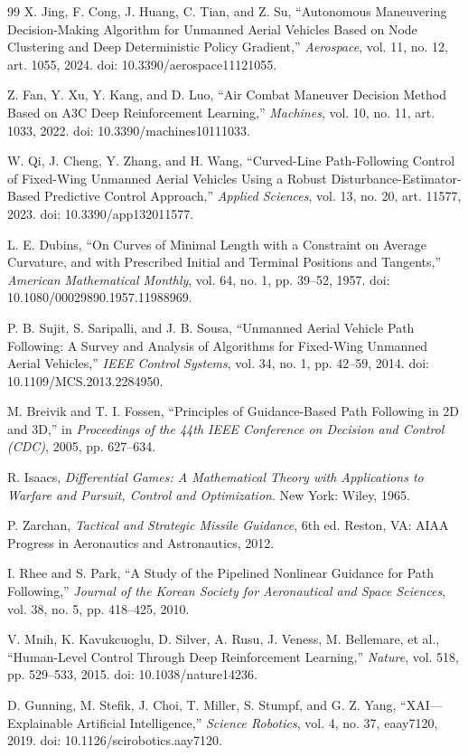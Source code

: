 \documentclass[drones,article,submit,pdftex,moreauthors]{Definitions/mdpi}
\begin{document}
\begin{thebibliography}{99}
X. Jing, F. Cong, J. Huang, C. Tian, and Z. Su,
``Autonomous Maneuvering Decision-Making Algorithm for Unmanned Aerial Vehicles Based on Node Clustering and Deep Deterministic Policy Gradient,''
\emph{Aerospace}, vol. 11, no. 12, art. 1055, 2024.
doi: 10.3390/aerospace11121055.

Z. Fan, Y. Xu, Y. Kang, and D. Luo,
``Air Combat Maneuver Decision Method Based on A3C Deep Reinforcement Learning,''
\emph{Machines}, vol. 10, no. 11, art. 1033, 2022.
doi: 10.3390/machines10111033.

W. Qi, J. Cheng, Y. Zhang, and H. Wang,
``Curved-Line Path-Following Control of Fixed-Wing Unmanned Aerial Vehicles Using a Robust Disturbance-Estimator-Based Predictive Control Approach,''
\emph{Applied Sciences}, vol. 13, no. 20, art. 11577, 2023.
doi: 10.3390/app132011577.

L. E. Dubins,
``On Curves of Minimal Length with a Constraint on Average Curvature, and with Prescribed Initial and Terminal Positions and Tangents,''
\emph{American Mathematical Monthly}, vol. 64, no. 1, pp. 39--52, 1957.
doi: 10.1080/00029890.1957.11988969.

P. B. Sujit, S. Saripalli, and J. B. Sousa,
``Unmanned Aerial Vehicle Path Following: A Survey and Analysis of Algorithms for Fixed-Wing Unmanned Aerial Vehicles,''
\emph{IEEE Control Systems}, vol. 34, no. 1, pp. 42--59, 2014.
doi: 10.1109/MCS.2013.2284950.

M. Breivik and T. I. Fossen,
``Principles of Guidance-Based Path Following in 2D and 3D,''
in \emph{Proceedings of the 44th IEEE Conference on Decision and Control (CDC)}, 2005, pp. 627--634.

R. Isaacs,
\emph{Differential Games: A Mathematical Theory with Applications to Warfare and Pursuit, Control and Optimization}.
New York: Wiley, 1965.

P. Zarchan,
\emph{Tactical and Strategic Missile Guidance}, 6th ed.
Reston, VA: AIAA Progress in Aeronautics and Astronautics, 2012.

I. Rhee and S. Park,
``A Study of the Pipelined Nonlinear Guidance for Path Following,''
\emph{Journal of the Korean Society for Aeronautical and Space Sciences}, vol. 38, no. 5, pp. 418--425, 2010.

V. Mnih, K. Kavukcuoglu, D. Silver, A. Rusu, J. Veness, M. Bellemare, et al.,
``Human-Level Control Through Deep Reinforcement Learning,''
\emph{Nature}, vol. 518, pp. 529--533, 2015.
doi: 10.1038/nature14236.

D. Gunning, M. Stefik, J. Choi, T. Miller, S. Stumpf, and G. Z. Yang,
``XAI---Explainable Artificial Intelligence,''
\emph{Science Robotics}, vol. 4, no. 37, eaay7120, 2019.
doi: 10.1126/scirobotics.aay7120.

\end{thebibliography}
\end{document}
